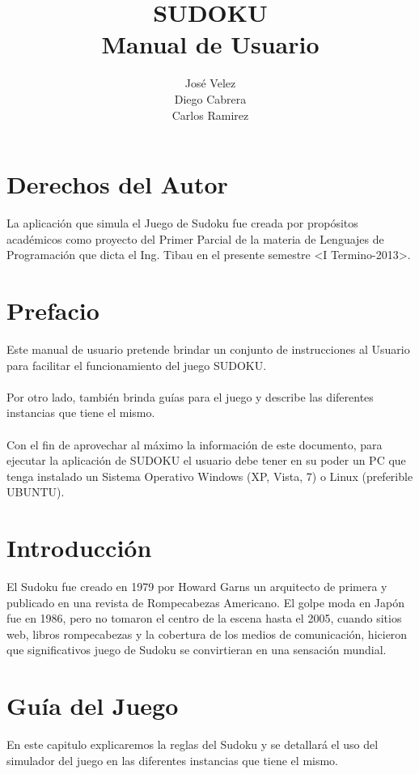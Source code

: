 \documentclass[12pt,oneside]{book}
\title{SUDOKU \\ Manual de Usuario}
\author{José Velez \\ Diego Cabrera \\ Carlos Ramirez}
\begin{document}
\maketitle
\tableofcontents


\chapter{Derechos del Autor}
La aplicaci\'on que simula el Juego de Sudoku fue creada por prop\'ositos acad\'emicos como proyecto del Primer Parcial de la materia de Lenguajes de Programación que dicta el Ing. Tibau en el presente semestre <I Termino-2013>.


\chapter{Prefacio}

Este manual de usuario pretende brindar un conjunto de instrucciones al Usuario para facilitar el funcionamiento del juego SUDOKU. \ \\ \\ 
Por otro lado, también brinda guías para el juego y describe las diferentes instancias que tiene el mismo. \ \\ \\
Con el fin de aprovechar al máximo la información de este documento, para ejecutar la aplicación de SUDOKU el usuario debe tener en su poder un PC que tenga instalado un Sistema Operativo Windows (XP, Vista, 7) o Linux (preferible UBUNTU).


\chapter{Introducción}

El Sudoku  fue creado en 1979 por Howard Garns un arquitecto de primera y publicado en una revista de Rompecabezas Americano. El golpe moda en Japón fue en 1986, pero no tomaron el centro de la escena hasta el 2005, cuando sitios web, libros rompecabezas y la cobertura de los medios de comunicación, hicieron que  significativos juego de Sudoku se convirtieran en una sensación mundial.



\chapter{Guía del Juego}

En este capitulo explicaremos la reglas del Sudoku y se detallar\'a el uso del simulador del juego en las diferentes instancias que tiene el mismo. 
\end{document}
